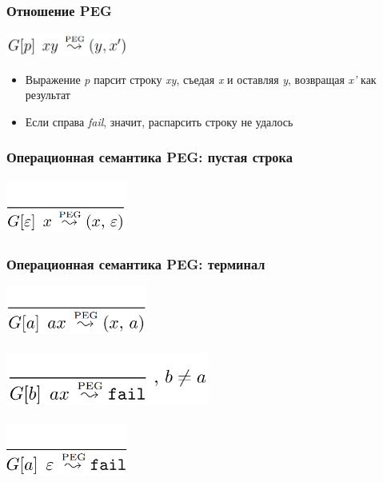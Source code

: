 \documentclass{beamer}
\begin{document}
\begin{frame}[fragile]
  \transwipe[direction=90]
  \frametitle{Отношение PEG}
\begin{center}
  \includegraphics[width=0.3\textwidth]{pics/pegRel}
\end{center}                                      
\begin{itemize}
  \item Выражение \textit{p} парсит строку \textit{xy}, съедая \textit{x} и оставляя \textit{y}, возвращая 
\textit{x'} как результат
  \item Если справа \textit{fail}, значит, распарсить строку не удалось
\end{itemize}
\end{frame}

\begin{frame}[fragile]
  \transwipe[direction=90]
  \frametitle{Операционная семантика PEG: пустая строка}
\begin{center}
  \includegraphics[width=0.3\textwidth]{pics/empty}
\end{center}                                      
\end{frame}

\begin{frame}[fragile]
  \transwipe[direction=90]
  \frametitle{Операционная семантика PEG: терминал}
\begin{center}
  \includegraphics[width=0.35\textwidth]{pics/char1}  \\~\\   \pause
  \includegraphics[width=0.5\textwidth]{pics/char2}   \\~\\   \pause
  \includegraphics[width=0.3\textwidth]{pics/char3}
\end{center}  
\end{frame}
\end{document}

